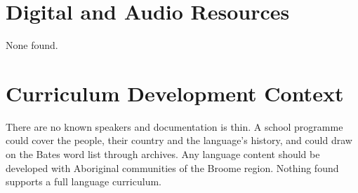 \documentclass[12pt]{article}
\begin{document}
\section{Digital and Audio Resources}
None found.

\section{Curriculum Development Context}
There are no known speakers and documentation is thin. A school programme could cover the people, their country and the language's history, and could draw on the Bates word list through archives. Any language content should be developed with Aboriginal communities of the Broome region. Nothing found supports a full language curriculum.
\end{document}
